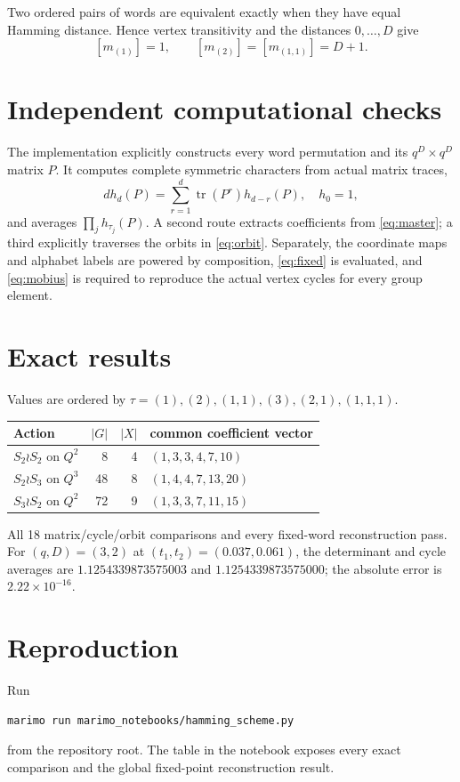 \documentclass[11pt]{article}
\begin{document}
Two ordered pairs of words are equivalent exactly when they have equal
Hamming distance.  Hence vertex transitivity and the distances $0,\ldots,D$
give
\[
[m_{(1)}]=1,\qquad [m_{(2)}]=[m_{(1,1)}]=D+1.
\]

\section{Independent computational checks}
The implementation explicitly constructs every word permutation and its
$q^D\times q^D$ matrix $P$.  It computes complete symmetric characters from
actual matrix traces,
\[
d h_d(P)=\sum_{r=1}^d\operatorname{tr}(P^r)h_{d-r}(P),\quad h_0=1,
\]
and averages $\prod_jh_{\tau_j}(P)$.  A second route extracts coefficients
from \eqref{eq:master}; a third explicitly traverses the orbits in
\eqref{eq:orbit}.  Separately, the coordinate maps and alphabet labels are
powered by composition, \eqref{eq:fixed} is evaluated, and \eqref{eq:mobius}
is required to reproduce the actual vertex cycles for every group element.

\section{Exact results}
Values are ordered by
$\tau=(1),(2),(1,1),(3),(2,1),(1,1,1)$.
\begin{center}
\begin{tabular}{@{}lrrl@{}}
\toprule
Action & $|G|$ & $|X|$ & common coefficient vector\\
\midrule
$S_2\wr S_2$ on $Q^2$ & 8 & 4 & $(1,3,3,4,7,10)$\\
$S_2\wr S_3$ on $Q^3$ & 48 & 8 & $(1,4,4,7,13,20)$\\
$S_3\wr S_2$ on $Q^2$ & 72 & 9 & $(1,3,3,7,11,15)$\\
\bottomrule
\end{tabular}
\end{center}
All 18 matrix/cycle/orbit comparisons and every fixed-word reconstruction
pass.  For $(q,D)=(3,2)$ at $(t_1,t_2)=(0.037,0.061)$, the determinant and
cycle averages are $1.1254339873575003$ and $1.1254339873575000$; the absolute
error is $2.22\times10^{-16}$.

\section{Reproduction}
Run
\begin{verbatim}
marimo run marimo_notebooks/hamming_scheme.py
\end{verbatim}
from the repository root.  The table in the notebook exposes every exact
comparison and the global fixed-point reconstruction result.
\end{document}

